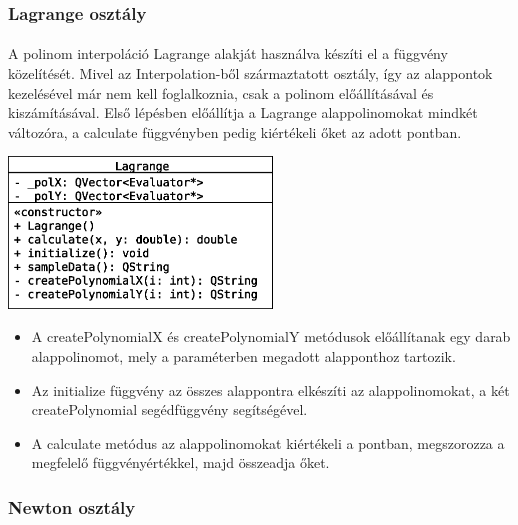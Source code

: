 \documentclass[12pt]{report}
\begin{document}
\subsubsection{Lagrange osztály}
\paragraph{}
A polinom interpoláció Lagrange alakját használva készíti el a függvény közelítését. Mivel az Interpolation-ből származtatott osztály, így az alappontok kezelésével már nem kell foglalkoznia, csak a polinom előállításával és kiszámításával. Első lépésben előállítja a Lagrange alappolinomokat mindkét változóra, a calculate függvényben pedig kiértékeli őket az adott pontban.
\begin{center}
\includegraphics[width=7cm]{pics/uml/Lagrange}
\end{center}
\begin{itemize}
\item A createPolynomialX és createPolynomialY metódusok előállítanak egy darab alappolinomot, mely a paraméterben megadott alapponthoz tartozik.
\item Az initialize függvény az összes alappontra elkészíti az alappolinomokat, a két createPolynomial segédfüggvény segítségével.
\item A calculate metódus az alappolinomokat kiértékeli a pontban, megszorozza a megfelelő függvényértékkel, majd összeadja őket.
\end{itemize}

\subsubsection{Newton osztály}
\end{document}
